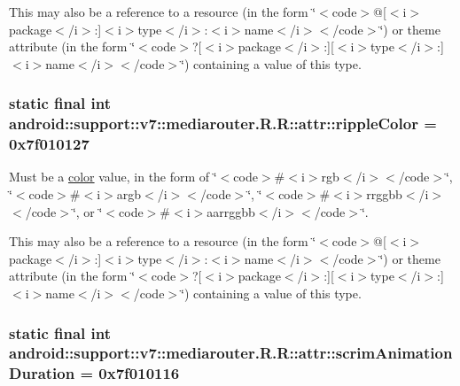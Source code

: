 This may also be a reference to a resource (in the form \char`\"{}$<$code$>$@\mbox{[}$<$i$>$package$<$/i$>$:\mbox{]}$<$i$>$type$<$/i$>$:$<$i$>$name$<$/i$>$$<$/code$>$\char`\"{}) or theme attribute (in the form \char`\"{}$<$code$>$?\mbox{[}$<$i$>$package$<$/i$>$:\mbox{]}\mbox{[}$<$i$>$type$<$/i$>$:\mbox{]}$<$i$>$name$<$/i$>$$<$/code$>$\char`\"{}) containing a value of this type. \hypertarget{classandroid_1_1support_1_1v7_1_1mediarouter_1_1_r_1_1attr_b48d03abd24bd7c2260f6918fe5cf7b2}{
\subsubsection[{rippleColor}]{\setlength{\rightskip}{0pt plus 5cm}static final int android::support::v7::mediarouter.R.R::attr::rippleColor = 0x7f010127}}
\label{classandroid_1_1support_1_1v7_1_1mediarouter_1_1_r_1_1attr_b48d03abd24bd7c2260f6918fe5cf7b2}


Must be a \hyperlink{classandroid_1_1support_1_1v7_1_1mediarouter_1_1_r_1_1color}{color} value, in the form of \char`\"{}$<$code$>$\#$<$i$>$rgb$<$/i$>$$<$/code$>$\char`\"{}, \char`\"{}$<$code$>$\#$<$i$>$argb$<$/i$>$$<$/code$>$\char`\"{}, \char`\"{}$<$code$>$\#$<$i$>$rrggbb$<$/i$>$$<$/code$>$\char`\"{}, or \char`\"{}$<$code$>$\#$<$i$>$aarrggbb$<$/i$>$$<$/code$>$\char`\"{}. 

This may also be a reference to a resource (in the form \char`\"{}$<$code$>$@\mbox{[}$<$i$>$package$<$/i$>$:\mbox{]}$<$i$>$type$<$/i$>$:$<$i$>$name$<$/i$>$$<$/code$>$\char`\"{}) or theme attribute (in the form \char`\"{}$<$code$>$?\mbox{[}$<$i$>$package$<$/i$>$:\mbox{]}\mbox{[}$<$i$>$type$<$/i$>$:\mbox{]}$<$i$>$name$<$/i$>$$<$/code$>$\char`\"{}) containing a value of this type. \hypertarget{classandroid_1_1support_1_1v7_1_1mediarouter_1_1_r_1_1attr_ab9957d818ad4b34f52a0822cae9cf4c}{
\subsubsection[{scrimAnimationDuration}]{\setlength{\rightskip}{0pt plus 5cm}static final int android::support::v7::mediarouter.R.R::attr::scrimAnimationDuration = 0x7f010116}}
\label{classandroid_1_1support_1_1v7_1_1mediarouter_1_1_r_1_1attr_ab9957d818ad4b34f52a0822cae9cf4c}


